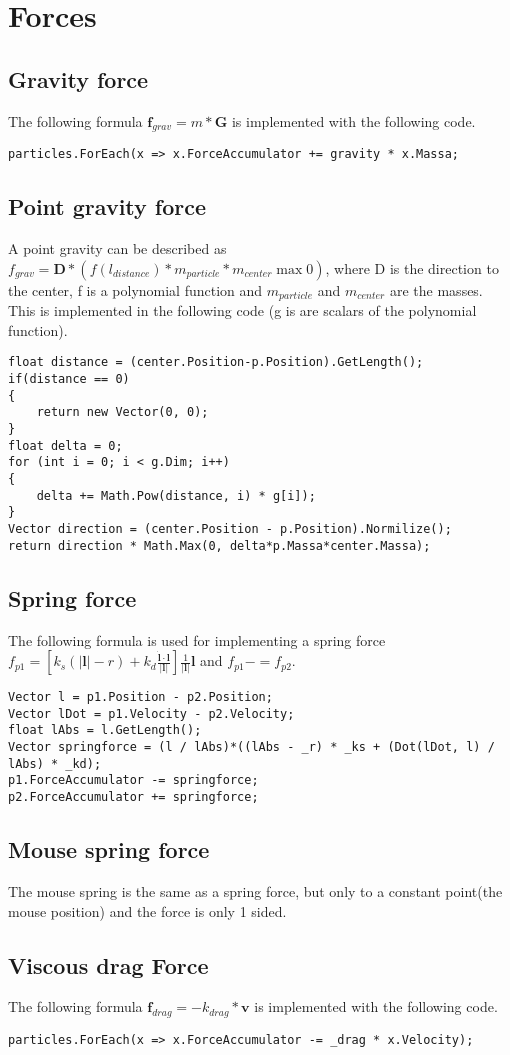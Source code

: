\chapter{Forces}

\section{Gravity force}
The following formula $\boldsymbol{f}_{grav} = m*\boldsymbol{G}$ is implemented with the following code.
\begin{lstlisting}
particles.ForEach(x => x.ForceAccumulator += gravity * x.Massa;
\end{lstlisting}

\section{Point gravity force}
A point gravity can be described as $f_{grav} = \boldsymbol{D}*(f(l_{distance})*m_{particle}*m_{center} \max 0)$, where D is the direction to the center, f is a polynomial function and $m_{particle}$ and $m_{center}$ are the masses. This is implemented in the following code (g is are scalars of the polynomial function).
\begin{lstlisting}
float distance = (center.Position-p.Position).GetLength();
if(distance == 0)
{
	return new Vector(0, 0);
}
float delta = 0;
for (int i = 0; i < g.Dim; i++)
{
	delta += Math.Pow(distance, i) * g[i]);
}
Vector direction = (center.Position - p.Position).Normilize();
return direction * Math.Max(0, delta*p.Massa*center.Massa);
\end{lstlisting}

\section{Spring force}
The following formula is used for implementing a spring force $f_{p1} = [{k_s(|\boldsymbol{l}| - r) + k_d \frac{\boldsymbol{\dot{l}}\cdot\boldsymbol{l}}{|\boldsymbol{l}|}}]\frac{1}{|\boldsymbol{l}|}\boldsymbol{l}$ and $f_{p1} -= f_{p2}$.
\begin{lstlisting}
Vector l = p1.Position - p2.Position;
Vector lDot = p1.Velocity - p2.Velocity;
float lAbs = l.GetLength();
Vector springforce = (l / lAbs)*((lAbs - _r) * _ks + (Dot(lDot, l) / lAbs) * _kd);
p1.ForceAccumulator -= springforce;
p2.ForceAccumulator += springforce;
\end{lstlisting}

\section{Mouse spring force}
The mouse spring is the same as a spring force, but only to a constant point(the mouse position) and the force is only 1 sided.

\section{Viscous drag Force}
The following formula $\boldsymbol{f}_{drag} = -k_{drag}*\boldsymbol{v}$ is implemented with the following code.
\begin{lstlisting}
particles.ForEach(x => x.ForceAccumulator -= _drag * x.Velocity);
\end{lstlisting}
